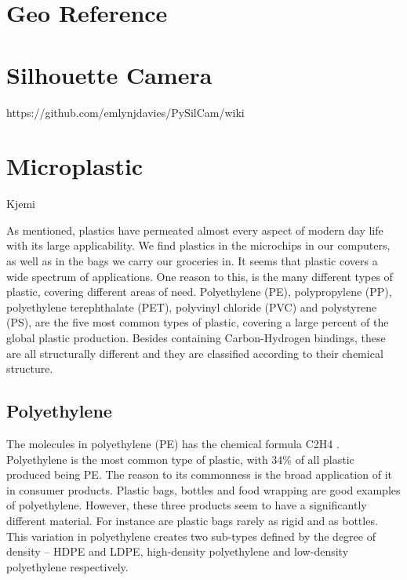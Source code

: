 \section{Geo Reference}


\section{Silhouette Camera}
https://github.com/emlynjdavies/PySilCam/wiki 



\section{Microplastic}
Kjemi

As mentioned, plastics have permeated almost every aspect of modern day life with its large applicability. We find plastics in the microchips in our computers, as well as in the bags we carry our groceries in. It seems that plastic covers a wide spectrum of applications.  One reason to this, is the many different types of plastic, covering different areas of need. Polyethylene (PE), polypropylene (PP), polyethylene terephthalate (PET), polyvinyl chloride (PVC) and polystyrene (PS), are the five most common types of plastic, covering a large  percent of the global plastic production. Besides containing Carbon-Hydrogen bindings, these are all structurally different and they are classified according to their chemical structure. 


\subsection{Polyethylene}
The molecules in polyethylene (PE) has the chemical formula C2H4 . Polyethylene is the most common type of plastic, with 34\% of all plastic produced being PE. The reason to its commonness is the broad application of it in consumer products. Plastic bags, bottles and food wrapping are good examples of polyethylene. However, these three products seem to have a significantly different material. For instance are plastic bags rarely as rigid and as bottles. This variation in polyethylene creates two sub-types defined by the degree of density – HDPE and LDPE, high-density polyethylene and low-density polyethylene respectively. 

